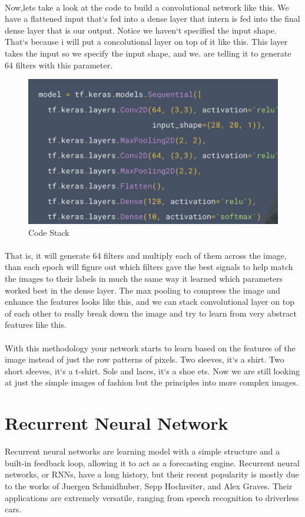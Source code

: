 \documentclass{article}
\begin{document}
    \paragraph{}
    Now,lets take a look at the code to build a convolutional network like this. We have a flattened input that`s fed into a dense layer that intern is fed into the final dense layer that is our output. Notice we haven`t specified the input shape. That`s because i will put a concolutional layer on top of it like this. This layer takes the input so we specify the input shape, and we. are telling it to generate 64 filters with this parameter.
    \vspace{10mm}
    \begin{figure}[h!]
      \includegraphics[width=0.4\linewidth]{img/code-stack.png}
      \caption{Code Stack}
      \label{fig:snn}
    \end{figure}
    \paragraph{}
    That is, it will generate 64 filters and multiply each of them across the image, than each epoch will figure out which filters gave the best signals to help match the images to their labels in much the same way it learned which parameters worked best in the dense layer. The max pooling to compress the image and enhance the features looks like this, and we can stack convolutional layer on top of each other to really break down the image and try to learn from very abstract features like this.
    \paragraph{}
    With this methodology your network starts to learn based on the features of the image instead of just the row patterns of pixels. Two sleeves, it`s a shirt. Two short sleeves, it`s a t-shirt. Sole and laces, it`s a shoe ets. Now we are still looking at just the simple images of fashion but the principles into more complex images. 



  \newpage
  \section{Recurrent Neural Network}
  Recurrent neural networks are learning model with a simple structure  and a built-in feedback loop, allowing it  to act as a forecasting engine. 
  Recurrent neural networks, or RNNs, have  a long history, but their recent popularity  is mostly due to the works of Juergen Schmidhuber,  Sepp Hochreiter, and Alex Graves. Their applications  are extremely versatile, ranging from speech  recognition to driverless cars.
\end{document}
